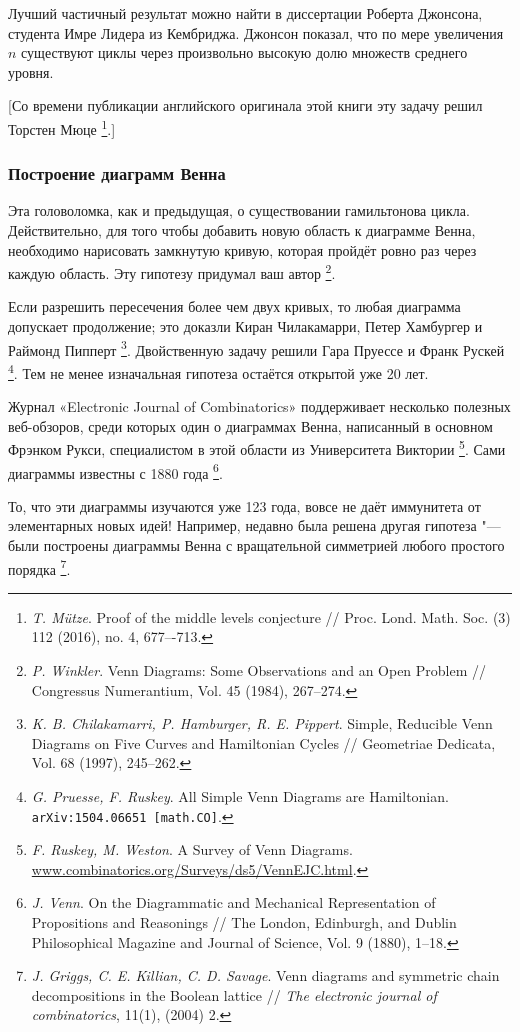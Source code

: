 \documentclass[twoside]{book}
\begin{document}
Лучший частичный результат можно найти в диссертации Роберта Джонсона, студента Имре Лидера из Кембриджа.
Джонсон показал, что по мере увеличения $n$ существуют циклы через произвольно высокую долю множеств среднего уровня.

[Со времени публикации английского оригинала этой книги эту задачу решил Торстен Мюце
\footnote{\emph{T. Mütze}. 
Proof of the middle levels conjecture /\!/
{Proc. Lond. Math. Soc.} (3) 112 (2016), no. 4, 677–-713.}.]

\subsubsection*{Построение диаграмм Венна}

Эта головоломка, как и предыдущая, о существовании гамильтонова цикла. 
Действительно, для того чтобы добавить новую область к диаграмме Венна, необходимо нарисовать замкнутую кривую, которая пройдёт ровно раз через каждую область.
Эту гипотезу придумал ваш автор%
\footnote{\emph{P. Winkler}. Venn Diagrams: Some Observations and an Open Problem /\!/ {Congressus Numerantium}, Vol. 45 (1984), 267--274.}.

Если разрешить пересечения более чем двух кривых, то любая диаграмма допускает продолжение; это доказли Киран Чилакамарри, Петер Хамбургер и Раймонд Пипперт%
\footnote{\emph{K. B. Chilakamarri, P. Hamburger, R. E. Pippert}.
Simple, Reducible Venn Diagrams on Five Curves and Hamiltonian Cycles /\!/ {Geometriae Dedicata}, Vol. 68 (1997), 245--262.}.
Двойственную задачу решили Гара Пруессе и Франк Рускей%
\footnote{\emph{G. Pruesse, F. Ruskey}.
All Simple Venn Diagrams are Hamiltonian.
\texttt{arXiv:1504.06651 [math.CO]}.}.
Тем не менее изначальная гипотеза остаётся открытой уже 20 лет.

Журнал «Electronic Journal of Combinatorics» поддерживает не\-сколь\-ко полезных веб-обзоров, среди которых один о диаграммах Венна, написанный в основном Фрэнком Рукси, специалистом в этой области из Университета Виктории%
\footnote{\emph{F. Ruskey, M. Weston}. {A Survey of Venn Diagrams}. \href{http://www.combinatorics.org/Surveys/ds5/VennEJC.html}{\url{www.combinatorics.org/Surveys/ds5/VennEJC.html}}.}.
Сами диаграммы известны с 1880 года%
\footnote{\emph{J. Venn}.
On the Diagrammatic and Mechanical Representation of Propositions and Reasonings /\!/ {The London, Edinburgh, and Dublin Philosophical Magazine and Journal of Science}, Vol. 9 (1880),  1--18.}.



То, что эти диаграммы изучаются уже 123 года, вовсе не даёт иммунитета от элементарных новых идей!
Например, недавно была решена другая гипотеза "--- были построены диаграммы Венна с вращательной симметрией любого простого порядка%
\footnote{\emph{J. Griggs, C. E. Killian, C. D. Savage}. Venn diagrams and symmetric chain decom\-po\-si\-tions in the Boolean lattice /\!/
\emph{The electronic journal of combinatorics}, 11(1), (2004) 2.}.
\end{document}

